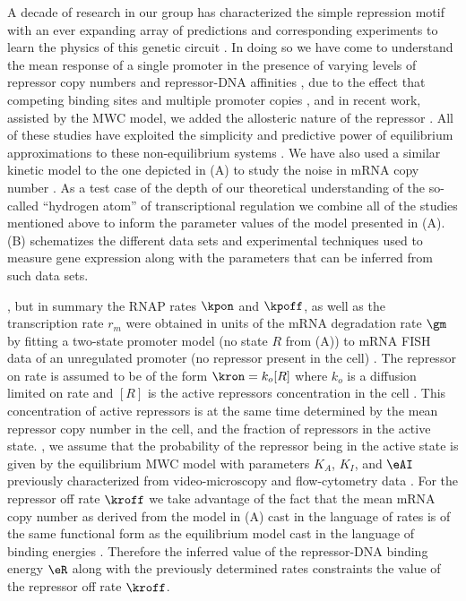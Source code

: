 A decade of research in our group has characterized the simple repression motif
with an ever expanding array of predictions and corresponding experiments to
learn the physics of this genetic circuit . In doing so
we have come to understand the mean response of a single promoter in the
presence of varying levels of repressor copy numbers and repressor-DNA
affinities \cite{Garcia2011c}, due to the effect that competing binding sites
and multiple promoter copies \cite{Brewster2014}, and in recent work, assisted
by the MWC model, we added the allosteric nature of the repressor
\cite{Razo-Mejia2018}. All of these studies have exploited the simplicity and
predictive power of equilibrium approximations to these non-equilibrium systems
\cite{Buchler2003}. We have also used a similar kinetic model to the one
depicted in (A) to study the noise in mRNA copy number
\cite{Jones2014a}. As a test case of the depth of our theoretical understanding
of the so-called ``hydrogen atom'' of transcriptional regulation we combine all
of the studies mentioned above to inform the parameter values of the model
presented in (A). (B)
schematizes the different data sets and experimental techniques used to measure
gene expression along with the parameters that can be inferred from such data
sets.

, but in summary the RNAP rates $\kpon$ and $\kpoff$, as
well as the transcription rate $r_m$ were obtained in units of the mRNA
degradation rate $\gm$ by fitting a two-state promoter model \cite{Peccoud1995}
(no state $R$ from (A)) to mRNA FISH data of an
unregulated promoter (no  repressor present in the cell) \cite{Jones2014a}. The
repressor on rate is assumed to be of the form $\kron = k_o [R]$ where $k_o$ is
a diffusion limited on rate and $[R]$ is the active repressors concentration in
the cell \cite{Jones2014a}. This concentration of active repressors is at the
same time determined by the mean repressor copy number in the cell, and the
fraction of repressors in the active state.  , we assume that the
probability of the repressor being in the active state is given by the
equilibrium MWC model with parameters $K_A$, $K_I$, and $\eAI$ previously
characterized from video-microscopy and flow-cytometry data
\cite{Razo-Mejia2018}. For the repressor off rate $\kroff$ we take advantage of
the fact that the mean mRNA copy number as derived from the model in
(A) cast in the language of rates is of the same
functional form as the equilibrium model cast in the language of binding
energies \cite{Phillips2015}. Therefore the inferred value of the repressor-DNA
binding energy $\eR$ along with the previously determined rates constraints the
value of the repressor off rate $\kroff$.


